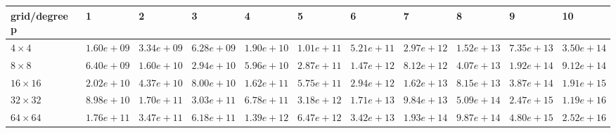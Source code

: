 \begin{tabular}{lllllllllll}
\hline
 grid/degree p   & 1          & 2          & 3          & 4          & 5          & 6          & 7          & 8          & 9          & 10         \\
\hline
 $4 \times 4$    & $1.60e+09$ & $3.34e+09$ & $6.28e+09$ & $1.90e+10$ & $1.01e+11$ & $5.21e+11$ & $2.97e+12$ & $1.52e+13$ & $7.35e+13$ & $3.50e+14$ \\
 $8 \times 8$    & $6.40e+09$ & $1.60e+10$ & $2.94e+10$ & $5.96e+10$ & $2.87e+11$ & $1.47e+12$ & $8.12e+12$ & $4.07e+13$ & $1.92e+14$ & $9.12e+14$ \\
 $16 \times 16$  & $2.02e+10$ & $4.37e+10$ & $8.00e+10$ & $1.62e+11$ & $5.75e+11$ & $2.94e+12$ & $1.62e+13$ & $8.15e+13$ & $3.87e+14$ & $1.91e+15$ \\
 $32 \times 32$  & $8.98e+10$ & $1.70e+11$ & $3.03e+11$ & $6.78e+11$ & $3.18e+12$ & $1.71e+13$ & $9.84e+13$ & $5.09e+14$ & $2.47e+15$ & $1.19e+16$ \\
 $64 \times 64$  & $1.76e+11$ & $3.47e+11$ & $6.18e+11$ & $1.39e+12$ & $6.47e+12$ & $3.42e+13$ & $1.93e+14$ & $9.87e+14$ & $4.80e+15$ & $2.52e+16$ \\
\hline
\end{tabular}
